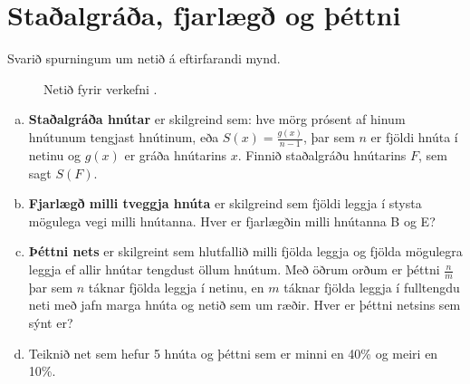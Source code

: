 \documentclass[b5paper,12pt]{book}
\renewcommand*\thesection{\arabic{section}}
\begin{document}
\section{Staðalgráða, fjarlægð og þéttni}
Svarið spurningum um netið á eftirfarandi mynd.
\begin{figure}[h!]
\centering
{}
\caption*{Netið fyrir verkefni \thesection{}.}
\end{figure}
\begin{enumerate}[(a)]
    \item \textbf{Staðalgráða hnútar} er skilgreind sem: hve mörg prósent af hinum hnútunum tengjast hnútinum, eða $S(x)=\frac{g(x)}{n-1}$, þar sem $n$ er fjöldi hnúta í netinu og $g(x)$ er gráða hnútarins $x$. Finnið staðalgráðu hnútarins $F$, sem sagt $S(F)$.
    \item \textbf{Fjarlægð milli tveggja hnúta} er skilgreind sem fjöldi leggja í stysta mögulega vegi milli hnútanna. Hver er fjarlægðin milli hnútanna B og E?
    \item \textbf{Þéttni nets} er skilgreint sem hlutfallið milli fjölda leggja og fjölda mögulegra leggja ef allir hnútar tengdust öllum hnútum. Með öðrum orðum er þéttni $\frac{n}{m}$ þar sem $n$ táknar fjölda leggja í netinu, en $m$ táknar fjölda leggja í fulltengdu neti með jafn marga hnúta og netið sem um ræðir. Hver er þéttni netsins sem sýnt er?
    \item Teiknið net sem hefur 5 hnúta og þéttni sem er minni en 40\% og meiri en 10\%.
\end{enumerate}
\end{document}
